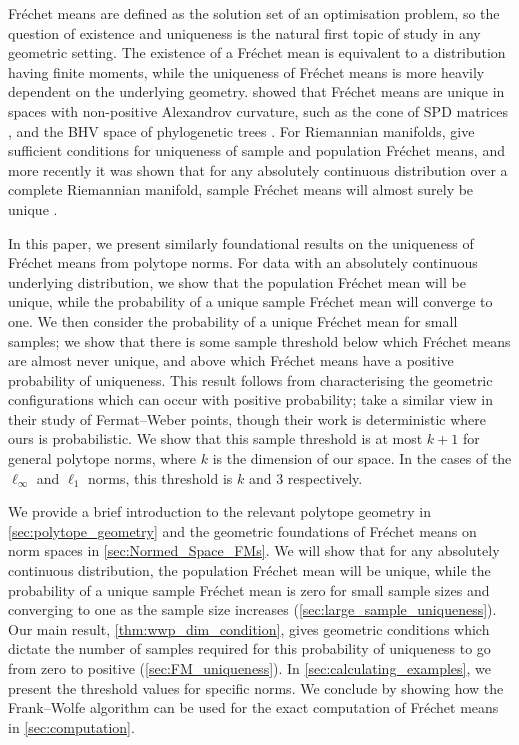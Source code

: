 \documentclass[10pt]{article}
\theoremstyle{definition}
\theoremstyle{remark}
\begin{document}
	Fr\'echet means are defined as the solution set of an optimisation problem, so the question of existence and uniqueness is the natural first topic of study in any geometric setting. The existence of a Fr\'echet mean is equivalent to a distribution having finite moments, while the uniqueness of Fr\'echet means is more heavily dependent on the underlying geometry. \cite{SturmHadamard} showed that Fr\'echet means are unique in spaces with non-positive Alexandrov curvature, such as the cone of SPD matrices \citep{arsigny2007geometric}, and the BHV space of phylogenetic trees \citep{billera2001geometry,nye2017principal}. For Riemannian manifolds, \cite{BhatPatFMI} give sufficient conditions for uniqueness of sample and population Fr\'echet means, and more recently it was shown that for any absolutely continuous distribution over a complete Riemannian manifold, sample Fr\'echet means will almost surely be unique \citep{arnaudon2014meansUniqueness}. 
	
	In this paper, we present similarly foundational results on the uniqueness of Fr\'echet means from polytope norms. For data with an absolutely continuous underlying distribution, we show that the population Fr\'echet mean will be unique, while the probability of a unique sample Fr\'echet mean will converge to one. We then consider the probability of a unique Fr\'echet mean for small samples; we show that there is some sample threshold below which Fr\'echet means are almost never unique, and above which Fr\'echet means have a positive probability of uniqueness. This result follows from characterising the geometric configurations which can occur with positive probability; \cite{durier1985geometricalFermateber} take a similar view in their study of Fermat--Weber points, though their work is deterministic where ours is probabilistic. We show that this sample threshold is at most $k+1$ for general polytope norms, where $k$ is the dimension of our space. In the cases of the $\ell_\infty$ and $\ell_1$ norms, this threshold is $k$ and 3 respectively. 
	
	We provide a brief introduction to the relevant polytope geometry in \cref{sec:polytope_geometry} and the geometric foundations of Fr\'echet means on norm spaces in \cref{sec:Normed_Space_FMs}. We will show that for any absolutely continuous distribution, the population Fr\'echet mean will be unique, while the probability of a unique sample Fr\'echet mean is zero for small sample sizes and converging to one as the sample size increases (\cref{sec:large_sample_uniqueness}). Our main result, \cref{thm:wwp_dim_condition}, gives geometric conditions which dictate the number of samples required for this probability of uniqueness to go from zero to positive (\cref{sec:FM_uniqueness}). In \cref{sec:calculating_examples}, we present the threshold values for specific norms. We conclude by showing how the Frank--Wolfe algorithm \citep{frank1956algorithm} can be used for the exact computation of Fr\'echet means in \cref{sec:computation}.
	
\end{document}

